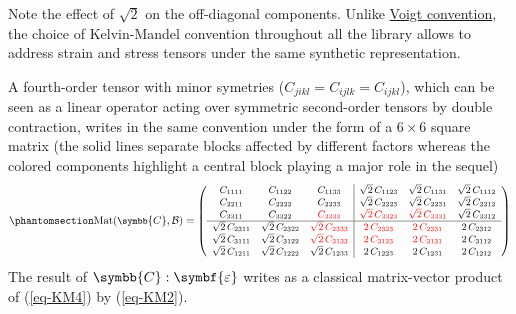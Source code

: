 \documentclass[
  a4paper,
  numbers=noendperiod,
  DIV=12]{scrreprt}
\newcommand{\uu}[1]{{\symbf{{#1}}}}
\newcommand{\uuuu}[1]{{\symbb{{#1}}}}
\newcommand{\eps}{{\uu{{\varepsilon}}}}
\DeclareMathOperator{\Mat}{Mat}
\begin{document}
\begin{tcolorbox}[enhanced jigsaw, title=\textcolor{quarto-callout-note-color}{\faInfo}\hspace{0.5em}{Note}, left=2mm, titlerule=0mm, colback=white, breakable, colframe=quarto-callout-note-color-frame, bottomtitle=1mm, toptitle=1mm, rightrule=.15mm, bottomrule=.15mm, coltitle=black, opacitybacktitle=0.6, arc=.35mm, colbacktitle=quarto-callout-note-color!10!white, leftrule=.75mm, opacityback=0, toprule=.15mm]

Note the effect of \(\sqrt{2}\) on the off-diagonal components. Unlike
\href{https://en.wikipedia.org/wiki/Voigt_notation}{Voigt convention},
the choice of Kelvin-Mandel convention throughout all the library allows
to address strain and stress tensors under the same synthetic
representation.

\end{tcolorbox}

A fourth-order tensor with minor symetries
(\(C_{jikl}=C_{ijlk}=C_{ijkl}\)), which can be seen as a linear operator
acting over symmetric second-order tensors by double contraction, writes
in the same convention under the form of a \(6\times 6\) square matrix
(the solid lines separate blocks affected by different factors whereas
the colored components highlight a central block playing a major role in
the sequel) \begin{equation}\phantomsection\label{eq-KM4}{
\small
\Mat(\uuuu{C},\mathcal{B})=
   \left(
   \begin{array}{ccc|ccc}
   C_{1111} & C_{1122} & C_{1133} & \sqrt{2}\,C_{1123} & \sqrt{2}\,C_{1131} & \sqrt{2}\,C_{1112} \\
   C_{2211} & C_{2222} & C_{2233} & \sqrt{2}\,C_{2223} & \sqrt{2}\,C_{2231} & \sqrt{2}\,C_{2212} \\
   C_{3311} & C_{3322} & \color{red}C_{3333} & \color{red}\sqrt{2}\,C_{3323} & \color{red}\sqrt{2}\,C_{3331} & \sqrt{2}\,C_{3312} \\
   \hline
   \sqrt{2}\,C_{2311} & \sqrt{2}\,C_{2322} & \color{red}\sqrt{2}\,C_{2333} & \color{red}2\,C_{2323} & \color{red}2\,C_{2331} & 2\,C_{2312} \\
   \sqrt{2}\,C_{3111} & \sqrt{2}\,C_{3122} & \color{red}\sqrt{2}\,C_{3133} & \color{red}2\,C_{3123} & \color{red}2\,C_{3131} & 2\,C_{3112} \\
   \sqrt{2}\,C_{1211} & \sqrt{2}\,C_{1222} & \sqrt{2}\,C_{1233} & 2\,C_{1223} & 2\,C_{1231} & 2\,C_{1212}
   \end{array}
   \right)
}\end{equation} The result of \(\uuuu{C}:\eps\) writes as a classical
matrix-vector product of (\ref{eq-KM4}) by (\ref{eq-KM2}).
\end{document}
